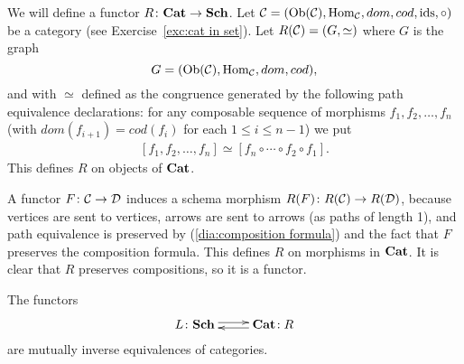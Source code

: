 \documentclass[CT4S-EN-RU]{subfiles}
\begin{document}
\begin{constructionRUS}
\end{constructionRUS}

\begin{constructionENG}
We will define a functor $R\colon{\mathbf{Cat}}\rightarrow{\mathbf{Sch}}$. Let $\mathcal{C}=(\textnormal{Ob}(\mathcal{C}),\textnormal{Hom}_\mathcal{C},dom,cod,\textnormal{ids},\circ)$ be a category (see Exercise~\ref{exc:cat in set}). Let $R(\mathcal{C})=(G,\simeq)$ where $G$ is the graph $$G=(\textnormal{Ob}(\mathcal{C}),\textnormal{Hom}_\mathcal{C},dom,cod),$$ and with $\simeq$ defined as the congruence generated by the following path equivalence declarations: for any composable sequence of morphisms $f_1,f_2,\ldots,f_n$ (with $dom(f_{i+1})=cod(f_i)$ for each $1\leq i\leq n-1$) we put 
\begin{align}\label{dia:composition formula}
[f_1,f_2,\ldots,f_n]\simeq [f_n\circ\cdots\circ f_2\circ f_1].
\end{align} 
This defines $R$ on objects of ${\mathbf{Cat}}$. 

A functor $F\colon\mathcal{C}\rightarrow\mathcal{D}$ induces a schema morphism $R(F)\colon R(\mathcal{C})\rightarrow R(\mathcal{D})$, because vertices are sent to vertices, arrows are sent to arrows (as paths of length 1), and path equivalence is preserved by (\ref{dia:composition formula}) and the fact that $F$ preserves the composition formula. This defines $R$ on morphisms in ${\mathbf{Cat}}$. It is clear that $R$ preserves compositions, so it is a functor.
\end{constructionENG}

\begin{constructionRUS}
\end{constructionRUS}

\begin{theoremENG}\label{thm:equivalence of categories and schemas}
The functors $$\xymatrix{L\taking\Sch\ar@<.5ex>[r]&\Cat\!:R\ar@<.5ex>[l]}$$ are mutually inverse equivalences of categories.
\end{theoremENG}

\begin{theoremRUS}\label{thm:equivalence of categories and schemas}
\end{theoremRUS}
\end{document}
